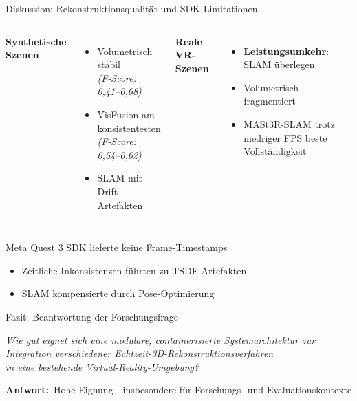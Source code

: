 \begin{frame}{Diskussion: Rekonstruktionsqualität und SDK-Limitationen}
    \begin{columns}[T]
        \textbf{Synthetische Szenen}
        \begin{itemize}
            \item Volumetrisch stabil\\
            {\small \textit{(F-Score: 0,41--0,68)}}
            \item VisFusion am konsistentesten\\
            {\small \textit{(F-Score: 0,54--0,62)}}
            \item SLAM mit Drift-Artefakten
        \end{itemize}
        
        \textbf{Reale VR-Szenen}
        \begin{itemize}
            \item \textbf{Leistungsumkehr}: SLAM überlegen
            \item Volumetrisch fragmentiert
            \item MASt3R-SLAM trotz niedriger FPS beste Vollständigkeit
        \end{itemize}
    \end{columns}
    
    \vfill
    
    \begin{tcolorbox}[box5, boxsep=0.5em, title={\textbf{Kernursache: SDK-Limitation}}]
        Meta Quest 3 SDK lieferte keine Frame-Timestamps
        \begin{itemize}
            \item Zeitliche Inkonsistenzen führten zu TSDF-Artefakten
            \item SLAM kompensierte durch Pose-Optimierung
        \end{itemize} 
    \end{tcolorbox}
\end{frame}

\begin{frame}{Fazit: Beantwortung der Forschungsfrage}{}
    \vfill
    \begin{center}
        \Large
        \textit{Wie gut eignet sich eine modulare, containerisierte Systemarchitektur zur\\
        Integration verschiedener Echtzeit-3D-Rekonstruktionsverfahren\\
        in eine bestehende Virtual-Reality-Umgebung?}
    \end{center}
    \vfill
    \begin{tcolorbox}[box5]
        \Large
        \centering
        \textbf{Antwort:}~Hohe Eignung - insbesondere für Forschungs- und Evaluationskontexte
    \end{tcolorbox} 
\end{frame}


